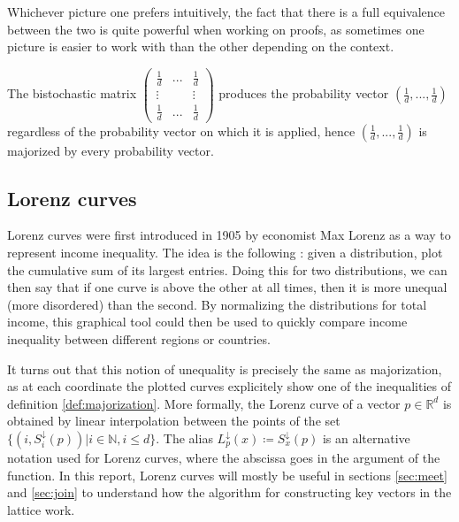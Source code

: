 Whichever picture one prefers intuitively, the fact that there is a full equivalence between the two is quite powerful when working on proofs, as sometimes one picture is easier to work with than the other depending on the context.

\begin{remark}
    The bistochastic matrix $\begin{pmatrix} \frac{1}{d} & ... & \frac{1}{d} \\
                                                      \vdots & & \vdots \\
                                                      \frac{1}{d} & ... & \frac{1}{d}
                             \end{pmatrix}$ 
    produces the probability vector $(\frac{1}{d}, ..., \frac{1}{d})$ regardless of the probability vector on which it is applied, hence $(\frac{1}{d}, ..., \frac{1}{d})$ is majorized by every probability vector.
\end{remark}



\subsection{Lorenz curves}

Lorenz curves were first introduced in 1905 by economist Max Lorenz as a way to represent income inequality. The idea is the following : given a distribution, plot the cumulative sum of its largest entries. Doing this for two distributions, we can then say that if one curve is above the other at all times, then it is more unequal (more disordered) than the second. By normalizing the distributions for total income, this graphical tool could then be used to quickly compare income inequality between different regions or countries.

It turns out that this notion of unequality is precisely the same as majorization, as at each coordinate the plotted curves explicitely show one of the inequalities of definition \ref{def:majorization}. More formally, the Lorenz curve of a vector $p \in \mathbb{R}^d$ is obtained by linear interpolation between the points of the set $\{(i, S^\downarrow_i(p)) | i \in \mathbb{N}, i \leq d\}$. %
The alias $L^\downarrow_p (x) \coloneqq S^\downarrow_x (p)$ is an alternative notation used for Lorenz curves, where the abscissa goes in the argument of the function. In this report, Lorenz curves will mostly be useful in sections \ref{sec:meet} and \ref{sec:join} to understand how the algorithm for constructing key vectors in the lattice work.

